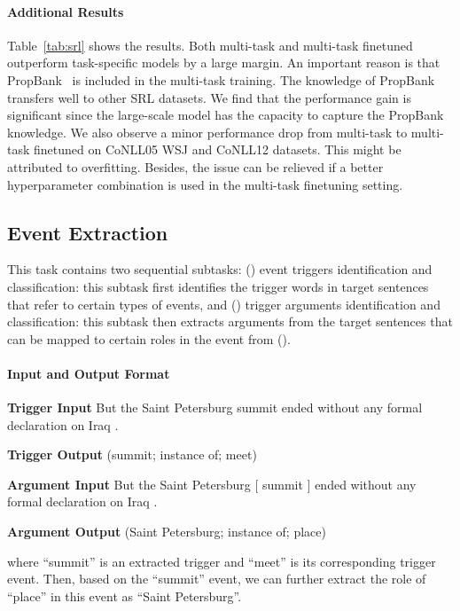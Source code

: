 \paragraph{Additional Results}
Table~\ref{tab:srl} shows the results. Both multi-task and multi-task finetuned \method outperform task-specific models by a large margin. An important reason is that PropBank~\cite{kingsbury2003propbank} is included in the multi-task training. The knowledge of PropBank transfers well to other SRL datasets. We find that the performance gain is significant since the large-scale model has the capacity to capture the PropBank knowledge. We also observe a minor performance drop from multi-task to multi-task finetuned \method on CoNLL05 WSJ and CoNLL12 datasets. This might be attributed to overfitting. Besides, the issue can be relieved if a better hyperparameter combination is used in the multi-task finetuning setting. 

\subsection{Event Extraction}
This task contains two sequential subtasks: (\expandafter{}) event triggers identification and classification: this subtask first identifies the trigger words in target sentences that refer to certain types of events, and (\expandafter{}) trigger arguments identification and classification: this subtask then extracts arguments from the target sentences that can be mapped to certain roles in the event from (\expandafter{}).

\paragraph{Input and Output Format}
\begin{enumerate*}
    \item[] {\bf Trigger Input} But the Saint Petersburg summit ended without any formal declaration on Iraq .
    \item[] {\bf Trigger Output} (summit; instance of; meet)
    \item[] {\bf Argument Input} But the Saint Petersburg [ summit ] ended without any formal declaration on Iraq .
    \item[] {\bf Argument Output} (Saint Petersburg; instance of; place)
\end{enumerate*}

\noindent where ``summit'' is an extracted trigger and ``meet'' is its corresponding trigger event. Then, based on the ``summit'' event, we can further extract the role of ``place'' in this event as ``Saint Petersburg''.

